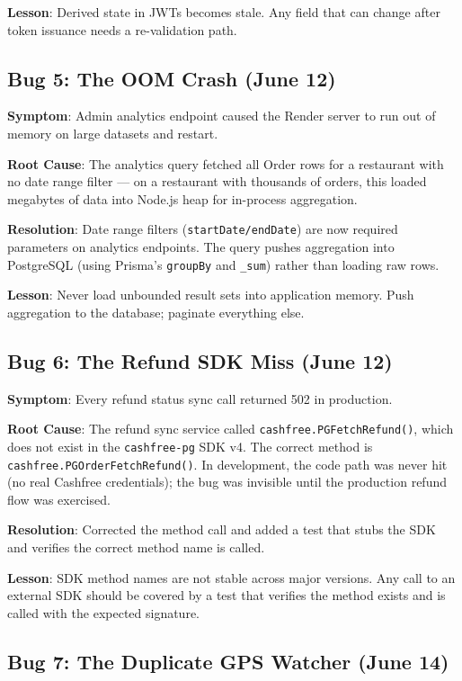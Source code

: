 \documentclass[11pt,a4paper,twoside]{book}
\begin{document}
\textbf{Lesson}: Derived state in JWTs becomes stale.  Any field that can change
after token issuance needs a re-validation path.

\subsection{Bug 5: The OOM Crash (June 12)}

\textbf{Symptom}: Admin analytics endpoint caused the Render server to run out of
memory on large datasets and restart.

\textbf{Root Cause}: The analytics query fetched all Order rows for a restaurant
with no date range filter — on a restaurant with thousands of orders, this
loaded megabytes of data into Node.js heap for in-process aggregation.

\textbf{Resolution}: Date range filters (\texttt{startDate/endDate}) are now
required parameters on analytics endpoints.  The query pushes aggregation into
PostgreSQL (using Prisma's \texttt{groupBy} and \texttt{\_sum}) rather than
loading raw rows.

\textbf{Lesson}: Never load unbounded result sets into application memory.
Push aggregation to the database; paginate everything else.

\subsection{Bug 6: The Refund SDK Miss (June 12)}

\textbf{Symptom}: Every refund status sync call returned 502 in production.

\textbf{Root Cause}: The refund sync service called \texttt{cashfree.PGFetchRefund()},
which does not exist in the \texttt{cashfree-pg} SDK v4.  The correct method
is \texttt{cashfree.PGOrderFetchRefund()}.  In development, the code path was
never hit (no real Cashfree credentials); the bug was invisible until the
production refund flow was exercised.

\textbf{Resolution}: Corrected the method call and added a test that stubs the
SDK and verifies the correct method name is called.

\textbf{Lesson}: SDK method names are not stable across major versions.  Any call
to an external SDK should be covered by a test that verifies the method exists
and is called with the expected signature.

\subsection{Bug 7: The Duplicate GPS Watcher (June 14)}
\end{document}
